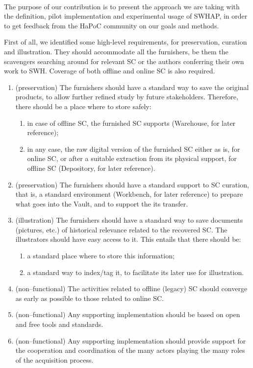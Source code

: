 \documentclass[a4paper]{article}
\begin{document}
\

\noindent
The purpose of our contribution is to present the approach we are taking with the definition, pilot implementation and experimental usage of SWHAP, in order to get feedback from the HaPoC community on our goals and methods. 

First of all, we identified some high-level requirements, for preservation, curation and illustration. They should accommodate all the furnishers, be them the scavengers searching around for relevant SC or the authors conferring their own work to SWH. Coverage of both offline and online SC is also required. 
\begin{enumerate}
	\item (preservation) The furnishers should have a standard way to save the original products, to allow further refined study by future stakeholders. Therefore, there should be a place where to store safely:
	\begin{enumerate}
		\item in case of offline SC, the furnished SC supports (Warehouse, for later reference);
		\item in any case, the raw digital version of the furnished SC either as is, for online SC, or after a suitable extraction from its physical support, for offline SC (Depository, for later reference).
	\end{enumerate}
	\item (preservation) The furnishers should have a standard support to SC curation, that is, a standard environment (Workbench, for later reference) to prepare what goes into the  Vault, and to support the its transfer. 
	\item (illustration) The furnishers should have a standard way to save documents (pictures, etc.) of historical relevance related to the recovered SC. The illustrators should have easy access to it. This entails that there should be:
	\begin{enumerate}
		\item a standard place where to store this information;
		\item a standard way to index/tag it, to facilitate its later use for illustration.
		\end{enumerate}
	\item (non--functional) The activities related to offline (legacy) SC should converge as early as possible to those related to online SC.
	\item (non--functional) Any supporting implementation should be 
	based on open and free tools and standards.
	\item (non--functional) Any supporting implementation should provide support for 
the cooperation and coordination of the many actors playing the many roles of the acquisition process.	
\end{enumerate}
\end{document}
